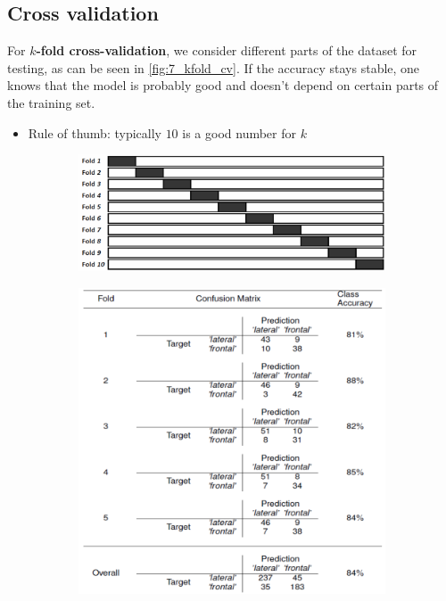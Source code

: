 \subsection{Cross validation}

For \textbf{$k$-fold cross-validation}, we consider different parts of the dataset for testing, as can be seen in \ref{fig:7_kfold_cv}. If the accuracy stays stable, one knows that the model is probably good and doesn't depend on certain parts of the training set.
\begin{itemize}
  \item Rule of thumb: typically $10$ is a good number for $k$
\end{itemize}

\begin{figure}[H]
  \centering
  \begin{subfigure}{0.5\textwidth}
    \centering
    \includegraphics[width=\textwidth]{assets/sl/cross_val__kfold_set.png}
  \end{subfigure}
  \hspace*{0.05\textwidth}
  \begin{subfigure}{0.4\textwidth}
    \centering
    \includegraphics[width=\textwidth]{assets/sl/cross_val__kfold_res.png}
  \end{subfigure}


\end{figure}
